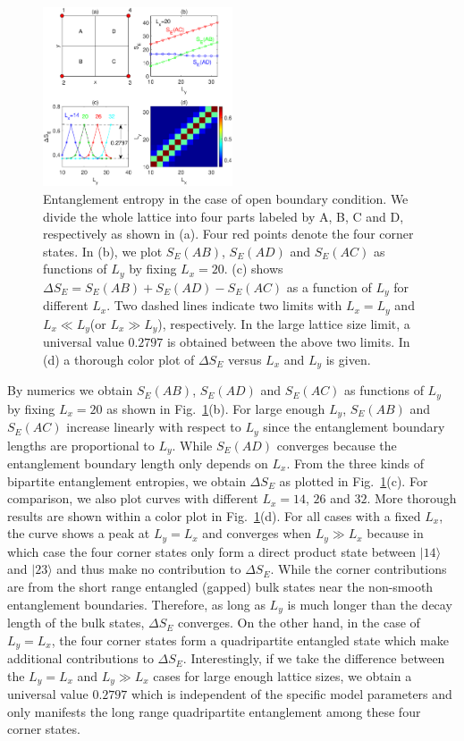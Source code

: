 \documentclass[doublecol]{epl2} %
\begin{document}
\begin{figure}
	\includegraphics[width=0.5\textwidth]{quadripartite.eps}
	\caption{\label{fig:quadripartite} Entanglement entropy in the case of open boundary condition. We divide the whole lattice into four parts labeled by A, B, C and D, respectively as shown in (a). Four red points denote the four corner states. In (b), we plot $S_E(AB)$, $S_E(AD)$ and $S_E(AC)$ as functions of $L_y$ by fixing $L_x=20$. (c) shows $\Delta S_E=S_E(AB)+S_E(AD)-S_E(AC)$ as a function of $L_y$ for different $L_x$. Two dashed lines indicate two limits with $L_x=L_y$ and $L_x\ll L_y$(or $L_x\gg L_y$), respectively. In the large lattice size limit, a universal value $0.2797$ is obtained between the above two limits. In (d) a thorough color plot of $\Delta S_E$ versus $L_x$ and $L_y$ is given.}
\end{figure}

By numerics we obtain $S_E(AB)$, $S_E(AD)$ and $S_E(AC)$ as functions of $L_y$ by fixing $L_x=20$ as shown in Fig.~\ref{fig:quadripartite}(b). For large enough $L_y$, $S_E(AB)$ and $S_E(AC)$ increase linearly with respect to $L_y$ since the entanglement boundary lengths are proportional to $L_y$. While $S_E(AD)$ converges because the entanglement boundary length only depends on $L_x$. From the three kinds of bipartite entanglement entropies, we obtain $\Delta S_E$ as plotted in Fig.~\ref{fig:quadripartite}(c). For comparison, we also plot curves with different $L_x=14$, $26$ and $32$. More thorough results are shown within a color plot in Fig.~\ref{fig:quadripartite}(d). For all cases with a fixed $L_x$, the curve shows a peak at $L_y=L_x$ and converges when $L_y\gg L_x$ because in which case the four corner states only form a direct product state between $|14\rangle$ and $|23\rangle$ and thus make no contribution to $\Delta S_E$. While the corner contributions are from the short range entangled (gapped) bulk states near the non-smooth entanglement boundaries. Therefore, as long as $L_y$ is much longer than the decay length of the bulk states, $\Delta S_E$ converges. On the other hand, in the case of $L_y=L_x$, the four corner states form a quadripartite entangled state which make additional contributions to $\Delta S_E$. Interestingly, if we take the difference between the $L_y=L_x$ and $L_y\gg L_x$ cases for large enough lattice sizes, we obtain a universal value $0.2797$ which is independent of the specific model parameters and only manifests the long range quadripartite entanglement among these four corner states.
\end{document}
